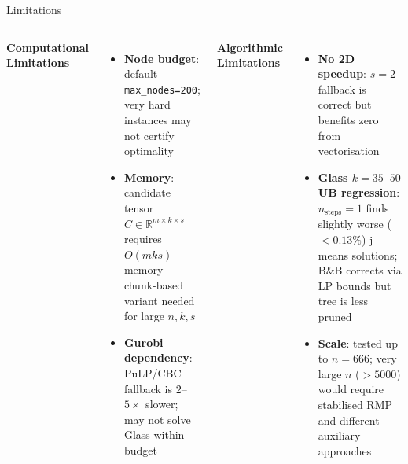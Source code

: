 \documentclass[aspectratio=169,12pt]{beamer}
\begin{document}
\begin{frame}{Limitations}
  \begin{columns}[T]
      \textbf{Computational Limitations}
      \begin{itemize}
        \item \textbf{Node budget}: default \texttt{max\_nodes=200}; very hard instances may not certify optimality
        \item \textbf{Memory}: candidate tensor $C \in \mathbb{R}^{m\times k\times s}$ requires $O(mks)$ memory — chunk-based variant needed for large $n,k,s$
        \item \textbf{Gurobi dependency}: PuLP/CBC fallback is $2$--$5\times$ slower; may not solve Glass within budget
      \end{itemize}

      \textbf{Algorithmic Limitations}
      \begin{itemize}
        \item \textbf{No 2D speedup}: $s=2$ fallback is correct but benefits zero from vectorisation
        \item \textbf{Glass $k=35$--$50$ UB regression}: $n_\text{steps}=1$ finds slightly worse ($<0.13\%$) j-means solutions; B\&B corrects via LP bounds but tree is less pruned
        \item \textbf{Scale}: tested up to $n=666$; very large $n$ ($>5000$) would require stabilised RMP and different auxiliary approaches
      \end{itemize}
  \end{columns}
\end{frame}
\end{document}
